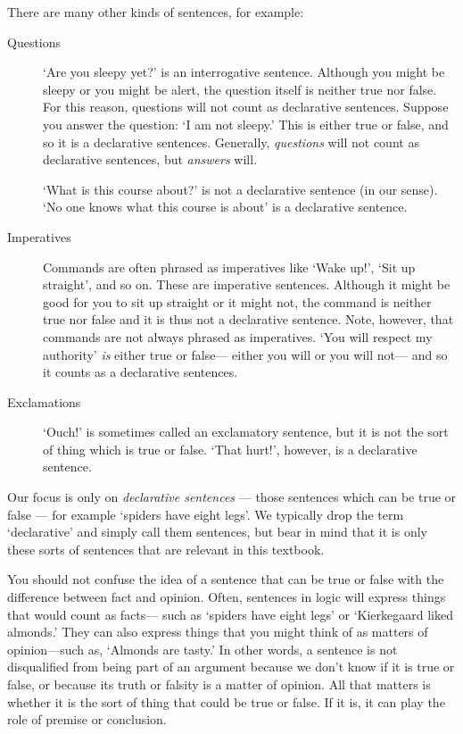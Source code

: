 There are many other kinds of sentences, for example:
\begin{description}
\item[{Questions}] `Are you sleepy yet?' is an interrogative sentence. Although you might be sleepy or you might be alert, the question itself is neither true nor false. For this reason, questions will not count as declarative sentences. Suppose you answer the question: `I am not sleepy.' This is either true or false, and so it is a declarative sentences. Generally, \emph{questions} will not count as declarative sentences, but \emph{answers} will. 

`What is this course about?' is not a declarative sentence (in our sense). `No one knows what this course is about' is a declarative sentence.

\item[{Imperatives}] Commands are often phrased as imperatives like `Wake up!', `Sit up straight', and so on. These are imperative sentences. Although it might be good for you to sit up straight or it might not, the command is neither true nor false and it is thus not a declarative sentence. Note, however, that commands are not always phrased as imperatives. `You will respect my authority' \emph{is} either true or false--- either you will or you will not--- and so it counts as a declarative sentences.

\item[{Exclamations}] `Ouch!' is sometimes called an exclamatory sentence, but it is not the sort of thing which is true or false. `That hurt!', however, is a declarative sentence. 

\end{description}

Our focus is only on \emph{declarative sentences} --- those sentences which can be true or false --- for example `spiders have eight legs'. We typically drop the term `declarative' and simply call them sentences, but bear in mind that it is only these sorts of sentences that are relevant in this textbook. 

You should not confuse the idea of a sentence that can be true or false with the difference between fact and opinion. Often, sentences in logic will express things that would count as facts--- such as `spiders have eight legs' or `Kierkegaard liked almonds.' They can also express things that you might think of as matters of opinion---such as, `Almonds are tasty.' In other words, a sentence is not disqualified from being part of an argument because we don't know if it is true or false, or because its truth or falsity is a matter of opinion. All that matters is whether it is the sort of thing that could be true or false. If it is, it can play the role of premise or conclusion.

